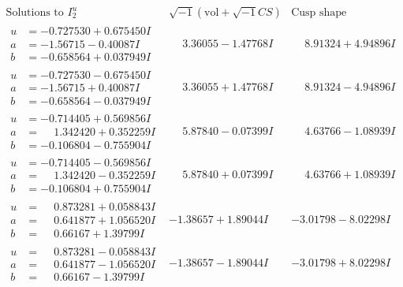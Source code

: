 \documentclass[1p]{elsarticle_modified}
\theoremstyle{definition}
\newcommand{\I}{\sqrt{-1}}
\begin{document}
$$\begin{array}{c|c|c}  
\text{Solutions to }I^u_{2}& \I (\text{vol} + \sqrt{-1}CS) & \text{Cusp shape}\\
 \hline 
\begin{aligned}
u &= -0.727530 + 0.675450 I \\
a &= -1.56715 - 0.40087 I \\
b &= -0.658564 + 0.037949 I\end{aligned}
 & \phantom{-}3.36055 - 1.47768 I & \phantom{-}8.91324 + 4.94896 I \\ \hline\begin{aligned}
u &= -0.727530 - 0.675450 I \\
a &= -1.56715 + 0.40087 I \\
b &= -0.658564 - 0.037949 I\end{aligned}
 & \phantom{-}3.36055 + 1.47768 I & \phantom{-}8.91324 - 4.94896 I \\ \hline\begin{aligned}
u &= -0.714405 + 0.569856 I \\
a &= \phantom{-}1.342420 + 0.352259 I \\
b &= -0.106804 - 0.755904 I\end{aligned}
 & \phantom{-}5.87840 - 0.07399 I & \phantom{-}4.63766 - 1.08939 I \\ \hline\begin{aligned}
u &= -0.714405 - 0.569856 I \\
a &= \phantom{-}1.342420 - 0.352259 I \\
b &= -0.106804 + 0.755904 I\end{aligned}
 & \phantom{-}5.87840 + 0.07399 I & \phantom{-}4.63766 + 1.08939 I \\ \hline\begin{aligned}
u &= \phantom{-}0.873281 + 0.058843 I \\
a &= \phantom{-}0.641877 + 1.056520 I \\
b &= \phantom{-}0.66167 + 1.39799 I\end{aligned}
 & -1.38657 + 1.89044 I & -3.01798 - 8.02298 I \\ \hline\begin{aligned}
u &= \phantom{-}0.873281 - 0.058843 I \\
a &= \phantom{-}0.641877 - 1.056520 I \\
b &= \phantom{-}0.66167 - 1.39799 I\end{aligned}
 & -1.38657 - 1.89044 I & -3.01798 + 8.02298 I \\ \hline\begin{aligned}

\end{aligned}
\end{array}$$
\end{document}
